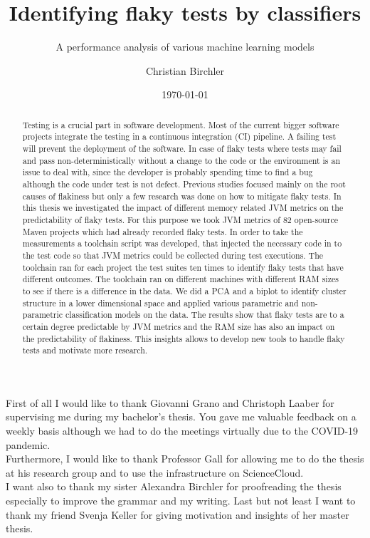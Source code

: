 \documentclass{seal_thesis}
\date{\today}
\title{Identifying flaky tests by classifiers}
\subtitle{A performance analysis of various machine learning models}
\author{Christian Birchler}
\begin{document}
\maketitle

\frontmatter

\begin{acknowledgements}
First of all I would like to thank Giovanni Grano and Christoph Laaber for supervising me during my bachelor's thesis. You gave me valuable feedback on a weekly basis although we had to do the meetings virtually due to the COVID-19 pandemic. \\

\noindent Furthermore, I would like to thank Professor Gall for allowing me to do the thesis at his research group and to use the infrastructure on ScienceCloud. \\

\noindent I want also to thank my sister Alexandra Birchler for proofreading the thesis especially to improve the grammar and my writing. Last but not least I want to thank my friend Svenja Keller for giving motivation and insights of her master thesis.
\end{acknowledgements}

\begin{abstract}
Testing is a crucial part in software development. Most of the current bigger software projects integrate the testing in a continuous integration (CI) pipeline. A failing test will prevent the deployment of the software. In case of flaky tests where tests may fail and pass non-deterministically without a change to the code or the environment is an issue to deal with, since the developer is probably spending time to find a bug although the code under test is not defect. Previous studies focused mainly on the root causes of flakiness but only a few research was done on how to mitigate flaky tests. In this thesis we investigated the impact of different memory related JVM metrics on the predictability of flaky tests. For this purpose we took JVM metrics of 82 open-source Maven projects which had already recorded flaky tests. In order to take the measurements a toolchain script was developed, that injected the necessary code in to the test code so that JVM metrics could be collected during test executions. The toolchain ran for each project the test suites ten times to identify flaky tests that have different outcomes. The toolchain ran on different machines with different RAM sizes to see if there is a difference in the data. We did a PCA and a biplot to identify cluster structure in a lower dimensional space and applied various parametric and non-parametric classification models on the data. The results show that flaky tests are to a certain degree predictable by JVM metrics and the RAM size has also an impact on the predictability of flakiness. This insights allows to develop new tools to handle flaky tests and motivate more research.
\end{abstract}
\end{document}
